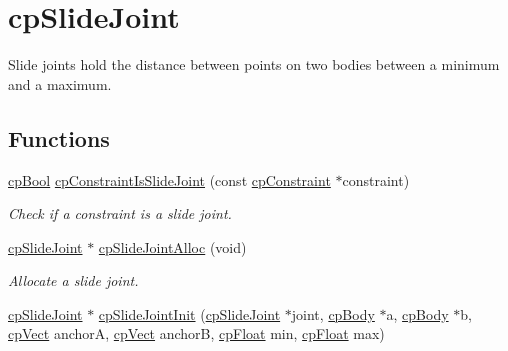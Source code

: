 \hypertarget{group__cp_slide_joint}{}\section{cp\+Slide\+Joint}
\label{group__cp_slide_joint}


Slide joints hold the distance between points on two bodies between a minimum and a maximum.  


\subsection*{Functions}
\begin{DoxyCompactItemize}
\item 
\hypertarget{group__cp_slide_joint_ga5e4feb32db6a9edeb3aac808c3293393}{}\hyperlink{group__basic_types_gabc5e752c48f3449ca26ef413ecbd647e}{cp\+Bool} \hyperlink{group__cp_slide_joint_ga5e4feb32db6a9edeb3aac808c3293393}{cp\+Constraint\+Is\+Slide\+Joint} (const \hyperlink{structcp_constraint}{cp\+Constraint} $\ast$constraint)\label{group__cp_slide_joint_ga5e4feb32db6a9edeb3aac808c3293393}

\begin{DoxyCompactList}\small\item\em Check if a constraint is a slide joint. \end{DoxyCompactList}\item 
\hypertarget{group__cp_slide_joint_ga57404455797d03603bf166f7ac1733b3}{}\hyperlink{structcp_slide_joint}{cp\+Slide\+Joint} $\ast$ \hyperlink{group__cp_slide_joint_ga57404455797d03603bf166f7ac1733b3}{cp\+Slide\+Joint\+Alloc} (void)\label{group__cp_slide_joint_ga57404455797d03603bf166f7ac1733b3}

\begin{DoxyCompactList}\small\item\em Allocate a slide joint. \end{DoxyCompactList}\item 
\hypertarget{group__cp_slide_joint_gadf69022e3dd81cef50593a4af54ac254}{}\hyperlink{structcp_slide_joint}{cp\+Slide\+Joint} $\ast$ \hyperlink{group__cp_slide_joint_gadf69022e3dd81cef50593a4af54ac254}{cp\+Slide\+Joint\+Init} (\hyperlink{structcp_slide_joint}{cp\+Slide\+Joint} $\ast$joint, \hyperlink{structcp_body}{cp\+Body} $\ast$a, \hyperlink{structcp_body}{cp\+Body} $\ast$b, \hyperlink{structcp_vect}{cp\+Vect} anchor\+A, \hyperlink{structcp_vect}{cp\+Vect} anchor\+B, \hyperlink{group__basic_types_gac1ed65573e035bf892505768c852d8d3}{cp\+Float} min, \hyperlink{group__basic_types_gac1ed65573e035bf892505768c852d8d3}{cp\+Float} max)\label{group__cp_slide_joint_gadf69022e3dd81cef50593a4af54ac254}


\end{DoxyCompactItemize}

